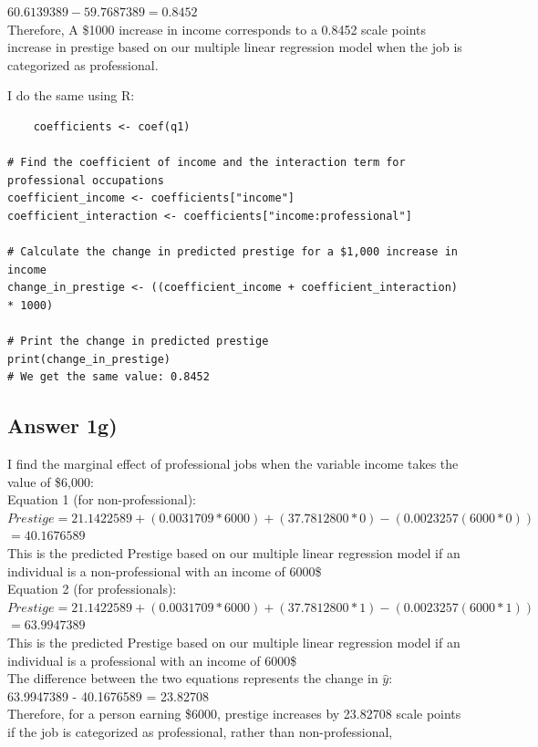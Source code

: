\documentclass{article}
\begin{document}
\begin{math}
60.6139389 - 59.7687389 = 0.8452    
\end{math}
\\
Therefore, A \$1000 increase in income corresponds to a 0.8452 scale points increase in prestige based on our multiple linear regression model when the job is categorized as professional.

I do the same using R:
\begin{verbatim}
    coefficients <- coef(q1)

# Find the coefficient of income and the interaction term for professional occupations
coefficient_income <- coefficients["income"]
coefficient_interaction <- coefficients["income:professional"]

# Calculate the change in predicted prestige for a $1,000 increase in income
change_in_prestige <- ((coefficient_income + coefficient_interaction) * 1000)

# Print the change in predicted prestige
print(change_in_prestige)
# We get the same value: 0.8452
\end{verbatim}

\subsection{Answer 1g)}
I find the marginal effect of professional jobs when the variable income takes the value of \$6,000:
\\
Equation 1 (for non-professional):
\\
\noindent $Prestige = 21.1422589 + (0.0031709*6000) + (37.7812800*0) -(0.0023257(6000*0))$
\\
$= 40.1676589$
\\
This is the predicted Prestige based on our multiple linear regression model if an individual is a non-professional with an income of 6000\$
\\
Equation 2 (for professionals):
\\
$Prestige = 21.1422589 + (0.0031709*6000) + (37.7812800*1) -(0.0023257(6000*1))$
\\
$= 63.9947389$
\\
This is the predicted Prestige based on our multiple linear regression model if an individual is a professional with an income of 6000\$
\\
The difference between the two equations represents the change in $\hat{y}$:
\\
63.9947389 - 40.1676589 = 23.82708
\\
Therefore, for a person earning \$6000, prestige increases by 23.82708 scale points if the job is categorized as professional, rather than non-professional,
\\
\end{document}
